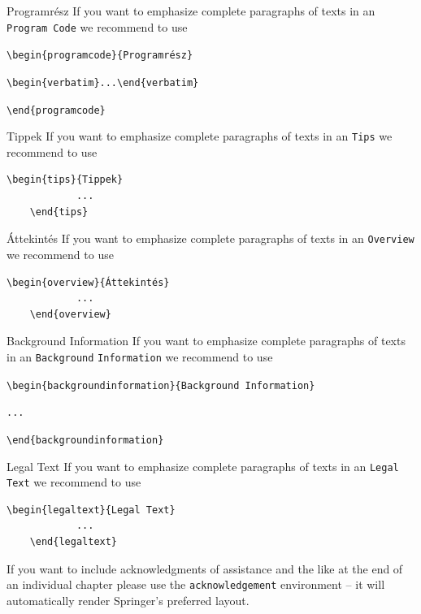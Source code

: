 \documentclass[graybox,envcountchap,sectrefs]{svmono}
\begin{document}
\begin{programcode}{Programrész}
	If you want to emphasize complete paragraphs of texts in an \verb|Program Code| we recommend to
	use
	
	\verb|\begin{programcode}{Programrész}|
		
		\verb|\begin{verbatim}...\end{verbatim}|
		
		\verb|\end{programcode}|
	
\end{programcode}
%
\begin{tips}{Tippek}
	If you want to emphasize complete paragraphs of texts in an \verb|Tips| we recommend to
	use  \begin{verbatim}\begin{tips}{Tippek}
			...
	\end{tips}\end{verbatim}
\end{tips}
%
%
\begin{overview}{Áttekintés}
	If you want to emphasize complete paragraphs of texts in an \verb|Overview| we recommend to
	use  \begin{verbatim}\begin{overview}{Áttekintés}
			...
	\end{overview}\end{verbatim}
\end{overview}

\begin{backgroundinformation}{Background Information}
	If you want to emphasize complete paragraphs of texts in an \verb|Background|
	\verb|Information| we recommend to
	use
	
	\verb|\begin{backgroundinformation}{Background Information}|
		
		\verb|...|
		
		\verb|\end{backgroundinformation}|
\end{backgroundinformation}
\begin{legaltext}{Legal Text}
	If you want to emphasize complete paragraphs of texts in an \verb|Legal Text| we recommend to
	use  \begin{verbatim}\begin{legaltext}{Legal Text}
			...
	\end{legaltext}\end{verbatim}
\end{legaltext}
%
\begin{acknowledgement}
	If you want to include acknowledgments of assistance and the like at the end of an individual chapter please use the \verb|acknowledgement| environment -- it will automatically render Springer's preferred layout.
\end{acknowledgement}
%
\end{document}
